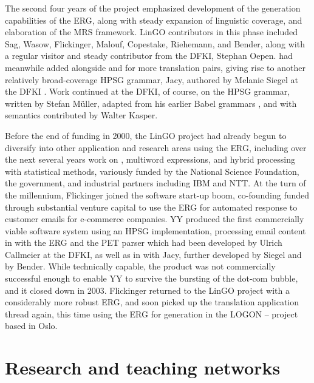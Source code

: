 \documentclass[output=paper,biblatex,babelshorthands,newtxmath,draftmode,colorlinks,citecolor=brown]{langscibook}
\begin{document}
\largerpage
The second four years of the \verbmobil project emphasized development of the generation capabilities of the ERG, along with steady expansion of linguistic coverage, and elaboration of the MRS framework.  LinGO contributors in this phase included Sag, Wasow, Flickinger, Malouf, Copestake, Riehemann, and Bender, along with a regular visitor and steady contributor from the DFKI, Stephan Oepen.  \verbmobil had meanwhile added  alongside  \citep{MK2000a} and  \citep*{FCS2000a} for more translation pairs, giving rise to another relatively broad-coverage HPSG grammar, Jacy, authored by Melanie Siegel at the DFKI \citep{Siegel2000a}.  Work continued at the DFKI, of course, on the  HPSG grammar, written by Stefan Müller, adapted from his earlier Babel grammars \citep{Mueller99a}, and with semantics contributed by Walter Kasper.

Before the end of \verbmobil funding in 2000, the LinGO project had already begun to diversify into
other application and research areas using the ERG, including over the next several years work on
, multiword expressions, and hybrid
processing with statistical methods, variously funded by the National Science Foundation, the  government, and industrial partners including IBM and NTT.  At the turn of the millennium, Flickinger joined the software start-up boom, co-founding  funded through substantial venture capital to use the ERG for automated response to customer emails for e-commerce companies.  YY produced the first commercially viable software system using an HPSG implementation, processing email content in  with the ERG and the PET parser \citep{callmeier00} which had been developed by Ulrich Callmeier at the DFKI, as well as in  with Jacy, further developed by Siegel and by Bender.  While technically capable, the product was not commercially successful enough to enable YY to survive the bursting of the dot-com bubble, and it closed down in 2003.  Flickinger returned to the LinGO project with a considerably more robust ERG, and soon picked up the translation application thread again, this time using the ERG for generation in the LOGON --  project \citep{Lon:Oep:Ber:04} based in Oslo.


\section{Research and teaching networks}
\end{document}
